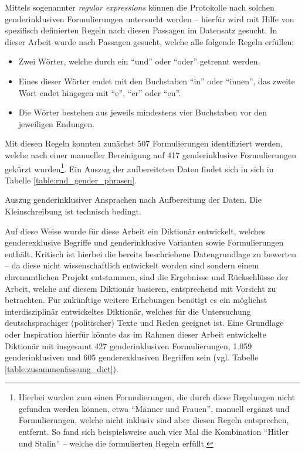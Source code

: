 \documentclass[12pt, 
    twoside=false, 
    bibliography=totoc, 
    numbers=endperiod, 
    headings=normal, 
    toc=chapterentrydotfill
    ]{scrbook}
\begin{document}
Mittels sogenannter \emph{regular expressions} \parencite{thompson_1968} können die Protokolle nach solchen genderinklusiven Formulierungen untersucht werden -- hierfür wird mit Hilfe von spezifisch definierten Regeln nach diesen Passagen im Datensatz gesucht. In dieser Arbeit wurde nach Passagen gesucht, welche alle folgende Regeln erfüllen:
\begin{itemize}
    \setlength\itemsep{0em}
    \item Zwei Wörter, welche durch ein \enquote{und} oder \enquote{oder} getrennt werden.
    \item Eines dieser Wörter endet mit den Buchstaben \enquote{in} oder \enquote{innen}, das zweite Wort endet hingegen mit \enquote{e}, \enquote{er} oder \enquote{en}.
    \item Die Wörter bestehen aus jeweils mindestens vier Buchstaben vor den jeweiligen Endungen.
\end{itemize}

Mit diesen Regeln konnten zunächst 507 Formulierungen identifiziert werden, welche nach einer manueller Bereinigung auf 417 genderinklusive Formulierungen gekürzt wurden\footnote{Hierbei wurden zum einen Formulierungen, die durch diese Regelungen nicht gefunden werden können, etwa \enquote{Männer und Frauen}, manuell ergänzt und Formulierungen, welche nicht inklusiv sind aber diesen Regeln entsprechen, entfernt. So fand sich beispielsweise auch vier Mal die Kombination \enquote{Hitler und Stalin} -- welche die formulierten Regeln erfüllt.}. Ein Auszug der aufbereiteten Daten findet sich in sich in Tabelle \ref{table:rnd_gender_phrasen}. 

%

\begin{table}[htb]
    \centering
    \caption[Auszug genderinklusiver Ansprachen nach Aufbereitung der Daten]{Auszug genderinklusiver Ansprachen nach Aufbereitung der Daten. 
    Die Kleinschreibung ist technisch bedingt.}
    
    \label{table:rnd_gender_phrasen}
\end{table}

%

Auf diese Weise wurde für diese Arbeit ein Diktionär entwickelt, welches genderexklusive Begriffe und genderinklusive Varianten sowie Formulierungen enthält. Kritisch ist hierbei die bereits beschriebene Datengrundlage zu bewerten -- da diese nicht wissenschaftlich entwickelt worden sind sondern einem ehrenamtlichen Projekt entstammen, sind die Ergebnisse und Rückschlüsse der Arbeit, welche auf diesem Diktionär basieren, entsprechend mit Vorsicht zu betrachten.
Für zukünftige weitere Erhebungen benötigt es ein möglichst interdisziplinär entwickeltes Diktionär, welches für die Untersuchung deutschsprachiger (politischer) Texte und Reden geeignet ist. Eine Grundlage oder Inspiration hierfür könnte das im Rahmen dieser Arbeit entwickelte Diktionär mit insgesamt 427 genderinklusiven Formulierungen, 1.059 genderinklusiven und 605 genderexklusiven Begriffen sein (vgl. Tabelle \ref{table:zusammenfassung_dict}).
\end{document}
